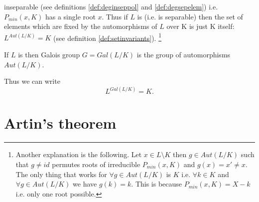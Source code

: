 \begin{remark}
\begin{enumerate}
    inseparable (see definitions 
    \ref {def:deginseppol} and \ref{def:degsepelem}) i.e.
    $P_{min}\left(x, K\right)$ has a 
    single root $x$. Thus if $L$ is
     (i.e. is separable) then
    the set of elements which are fixed  by the automorphisms  of $L$
    over K is just K itself: 
    $L^{Aut\left(L/K\right)} = K$
    (see definition \ref{def:setinvariants}).
    \footnote{
      Another explanation is the following. Let $x \in L \setminus K$
      then $g \in Aut\left(L/K\right)$ such that $g \ne id$ permutes
      roots of irreducible $P_{min}\left(x, K\right)$ and $g(x) = x'
      \ne x$. The only thing that works for 
      $\forall g \in Aut\left(L/K\right)$ is $K$ i.e.
      $\forall k \in K$ and $\forall g \in Aut\left(L/K\right)$ we
      have $g(k) = k$. This is because $P_{min}\left(x, K\right) = X
      - k$ i.e. only one root possible.
    }
  \end{enumerate}
  \label{rem:lec5_onnormalext}
\end{remark}

\begin{definition}
  If $L$ is  then Galois group $G =
  Gal\left(L/K\right)$ is the group of automorphisms $Aut\left(L/K\right)$. 
  \label{def:galoisgroup}
\end{definition}

Thus we can write
\begin{equation}
  L^{Gal\left(L/K\right)} = K.
  \label{eq:lec5_2}
\end{equation}

\section{Artin's theorem}

